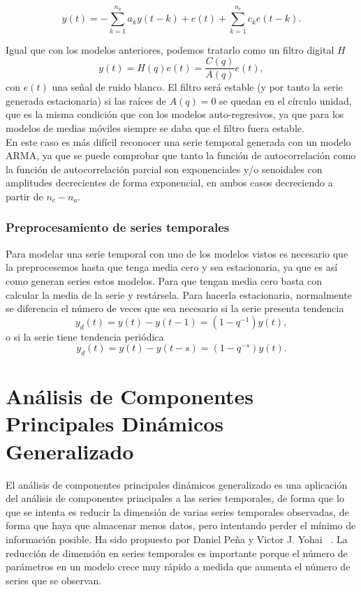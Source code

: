 \begin{equation}
y(t) = - \sum_{k=1}^{n_a} a_k y(t-k) + e(t) + \sum_{k=1}^{n_c} c_k e(t-k).
\end{equation}

Igual que con los modelos anteriores, podemos tratarlo como un filtro digital $H$
\[	y(t) = H(q)e(t) = \frac{C(q)}{A(q)}e(t),	\]
con $e(t)$ una señal de ruido blanco. El filtro será estable (y por tanto la serie generada estacionaria) si las raíces de $A(q) = 0$ se quedan en el círculo unidad, que es la misma condición que con los modelos auto-regresivos, ya que para los modelos de medias móviles siempre se daba que el filtro fuera estable.\\

En este caso es más difícil reconocer una serie temporal generada con un modelo ARMA, ya que se puede comprobar que tanto la función de autocorrelación como la función de autocorrelación parcial son exponenciales y/o senoidales con amplitudes decrecientes de forma exponencial, en ambos casos decreciendo a partir de $n_c-n_a$.

\subsubsection{Preprocesamiento de series temporales}

Para modelar una serie temporal con uno de los modelos vistos es necesario que la preprocesemos hasta que tenga media cero y sea estacionaria, ya que es así como generan series estos modelos. Para que tengan media cero basta con calcular la media de la serie y restársela. Para hacerla estacionaria, normalmente se diferencia el número de veces que sea necesario si la serie presenta tendencia
\[	y_d(t) = y(t) - y(t-1) = (1 - q^{-1})y(t),	\]
o si la serie tiene tendencia periódica
\[	y_d(t) = y(t) - y(t-s) = (1 - q^{-s})y(t).	\]


\section{Análisis de Componentes Principales Dinámicos Generalizado}

El análisis de componentes principales dinámicos generalizado es una aplicación del análisis de componentes principales a las series temporales, de forma que lo que se intenta es reducir la dimensión de varias series temporales observadas, de forma que haya que almacenar menos datos, pero intentando perder el mínimo de información posible. Ha sido propuesto por Daniel Peña y Victor J. Yohai ~\cite{pena16}. La reducción de dimensión en series temporales es importante porque el número de parámetros en un modelo crece muy rápido a medida que aumenta el número de series que se observan.

